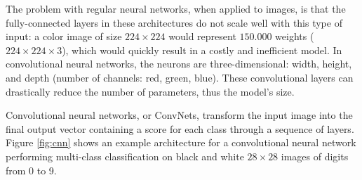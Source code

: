 The problem with regular neural networks, when applied to images, is that the
fully-connected layers in these architectures do not scale well with this type
of input: a color image of size $224 \times 224$ would represent $150.000$
weights ($224 \times 224 \times 3$), which would quickly result in a costly and
inefficient model. In convolutional neural networks, the neurons are
three-dimensional: width, height, and depth (number of channels: red, green,
blue). These convolutional layers can drastically reduce the number of
parameters, thus the model's size.



Convolutional neural networks, or ConvNets, transform the input image into the
final output vector containing a score for each class through a sequence of
layers. Figure \ref{fig:cnn} shows an example architecture for a convolutional
neural network performing multi-class classification on black and white $28
    \times 28$ images of digits from 0 to 9.

